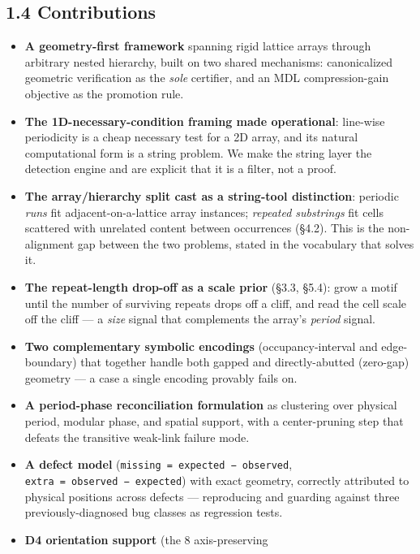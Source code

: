 \documentclass[
  11pt,
]{article}
\providecommand{\tightlist}{%
  \setlength{\itemsep}{0pt}\setlength{\parskip}{0pt}}
\begin{document}
\subsection{1.4 Contributions}\label{contributions}

\begin{itemize}
\tightlist
\item
  \textbf{A geometry-first framework} spanning rigid lattice arrays
  through arbitrary nested hierarchy, built on two shared mechanisms:
  canonicalized geometric verification as the \emph{sole} certifier, and
  an MDL compression-gain objective as the promotion rule.
\item
  \textbf{The 1D-necessary-condition framing made operational}:
  line-wise periodicity is a cheap necessary test for a 2D array, and
  its natural computational form is a string problem. We make the string
  layer the detection engine and are explicit that it is a filter, not a
  proof.
\item
  \textbf{The array/hierarchy split cast as a string-tool distinction}:
  periodic \emph{runs} fit adjacent-on-a-lattice array instances;
  \emph{repeated substrings} fit cells scattered with unrelated content
  between occurrences (§4.2). This is the non-alignment gap between the
  two problems, stated in the vocabulary that solves it.
\item
  \textbf{The repeat-length drop-off as a scale prior} (§3.3, §5.4):
  grow a motif until the number of surviving repeats drops off a cliff,
  and read the cell scale off the cliff --- a \emph{size} signal that
  complements the array's \emph{period} signal.
\item
  \textbf{Two complementary symbolic encodings} (occupancy-interval and
  edge-boundary) that together handle both gapped and directly-abutted
  (zero-gap) geometry --- a case a single encoding provably fails on.
\item
  \textbf{A period-phase reconciliation formulation} as clustering over
  physical period, modular phase, and spatial support, with a
  center-pruning step that defeats the transitive weak-link failure
  mode.
\item
  \textbf{A defect model} (\texttt{missing\ =\ expected\ −\ observed},
  \texttt{extra\ =\ observed\ −\ expected}) with exact geometry,
  correctly attributed to physical positions across defects ---
  reproducing and guarding against three previously-diagnosed bug
  classes as regression tests.
\item
  \textbf{D4 orientation support} (the 8 axis-preserving

\end{itemize}
\end{document}
